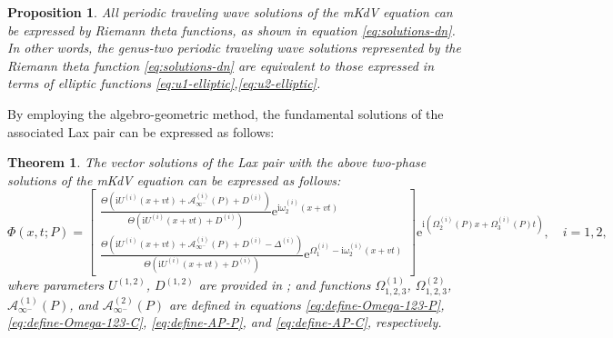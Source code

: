 \documentclass[11pt,reqno]{amsart}
\newcommand{\ii}{\mathrm{i}}
\newcommand{\ee}{\mathrm{e}}
\newtheorem{theorem}{Theorem}
\newtheorem{prop}{Proposition}
\numberwithin{equation}{section}
\begin{document}
\begin{prop}\label{prop:solutions-equivalent}
	All periodic traveling wave solutions of the mKdV equation can be expressed by Riemann theta functions, as shown in equation \eqref{eq:solutions-dn}. In other words, the genus-two periodic traveling wave solutions represented by the Riemann theta function \eqref{eq:solutions-dn} are equivalent to those expressed in terms of elliptic functions \eqref{eq:u1-elliptic},\eqref{eq:u2-elliptic}.
\end{prop}

By employing the algebro-geometric method, the fundamental solutions of the associated Lax pair can be expressed as follows:
\begin{theorem}\label{theorem:solution-Phi}
	The vector solutions of the Lax pair with the above two-phase solutions of the mKdV equation can be expressed as follows:
	\begin{equation}\label{eq:Phi-solution}
		\Phi(x,t;P)=
		\begin{bmatrix}
			\frac{\Theta(\ii U^{(i)}(x+v t)+\mathcal{A}^{(i)}_{\infty^{-}}(P)+D^{(i)})}{\Theta(\ii U^{(i)}(x+vt)+D^{(i)})}\ee^{\ii \omega_2^{(i)}(x+vt)}\\
			\frac{\Theta(\ii U^{(i)}(x+vt)+\mathcal{A}^{(i)}_{\infty^{-}}(P)+D^{(i)}-\Delta^{(i)})}{\Theta(\ii U^{(i)}(x+vt)+D^{(i)})}\ee^{\Omega_1^{(i)}-\ii \omega_2^{(i)} (x+vt)}
		\end{bmatrix}\ee^{\ii (\Omega_2^{(i)}(P) x+ \Omega_3^{(i)}(P) t)}, \quad i=1,2,
	\end{equation}
	where parameters $U^{(1,2)}$, $D^{(1,2)}$ are provided in ;
	and functions $\Omega_{1,2,3}^{(1)}$, $\Omega_{1,2,3}^{(2)}$, $\mathcal{A}^{(1)}_{ \infty^{-}}(P)$, and $\mathcal{A}^{(2)}_{ \infty^{-}}(P)$ are defined in equations \eqref{eq:define-Omega-123-P}, \eqref{eq:define-Omega-123-C}, \eqref{eq:define-AP-P}, and  \eqref{eq:define-AP-C}, respectively.
\end{theorem}
\end{document}
